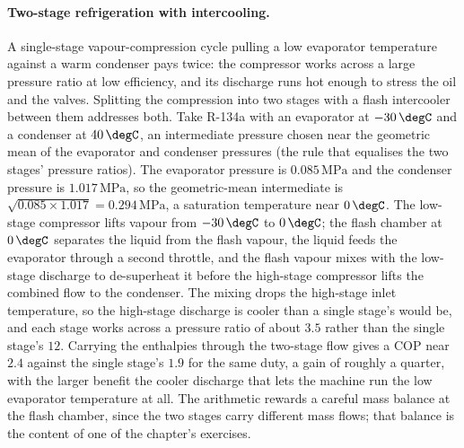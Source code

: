 \paragraph{Two-stage refrigeration with intercooling.} A single-stage
vapour-compression cycle pulling a low evaporator temperature against a
warm condenser pays twice: the compressor works across a large pressure
ratio at low efficiency, and its discharge runs hot enough to stress the
oil and the valves. Splitting the compression into two stages with a
flash intercooler between them addresses both. Take R-134a with an
evaporator at $-30\,\degC$ and a condenser at $40\,\degC$, an intermediate
pressure chosen near the geometric mean of the evaporator and condenser
pressures (the rule that equalises the two stages' pressure ratios). The
evaporator pressure is $0.085\,\text{MPa}$ and the condenser pressure is
$1.017\,\text{MPa}$, so the geometric-mean intermediate is $\sqrt{0.085
\times 1.017} = 0.294\,\text{MPa}$, a saturation temperature near
$0\,\degC$. The low-stage compressor lifts vapour from $-30\,\degC$ to
$0\,\degC$; the flash chamber at $0\,\degC$ separates the liquid from the
flash vapour, the liquid feeds the evaporator through a second throttle,
and the flash vapour mixes with the low-stage discharge to de-superheat
it before the high-stage compressor lifts the combined flow to the
condenser. The mixing drops the high-stage inlet temperature, so the
high-stage discharge is cooler than a single stage's would be, and each
stage works across a pressure ratio of about $3.5$ rather than the single
stage's $12$. Carrying the enthalpies through the two-stage flow gives a
COP near $2.4$ against the single stage's $1.9$ for the same duty, a gain
of roughly a quarter, with the larger benefit the cooler discharge that
lets the machine run the low evaporator temperature at all. The
arithmetic rewards a careful mass balance at the flash chamber, since the
two stages carry different mass flows; that balance is the content of one
of the chapter's exercises.

